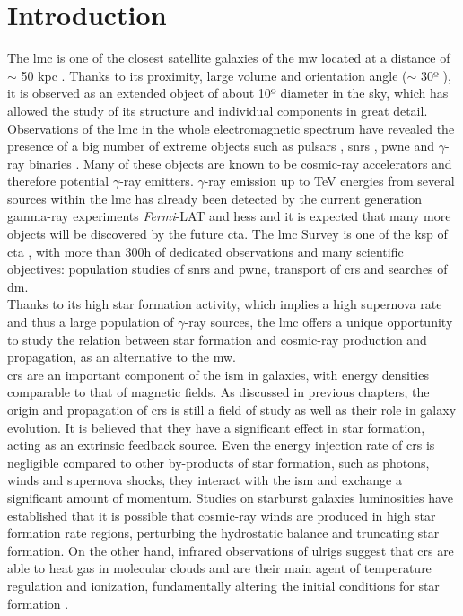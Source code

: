 \documentclass[main.tex]{subfiles}
\begin{document}
\glsresetall
\section{Introduction}

The \gls{lmc} is one of the closest satellite galaxies of the \gls{mw} located at a distance of $\sim$ 50 kpc \cite{2013LMCdistance1}. Thanks to its proximity, large volume and orientation angle ($\sim$ 30º \cite{2004StructureandOrientationLMC}), it is observed as an extended object of about 10º diameter in the sky, which has allowed the study of its structure and individual components in great detail. Observations of the \gls{lmc} in the whole electromagnetic spectrum have revealed the presence of a big number of extreme objects such as pulsars \cite{2013RadioPulsarsLMC} \cite{2016LMCFermiLAT}, \glspl{snr} \cite{2015MultiwavelengthLMCsnr} \cite{2012XMM1987} \cite{2016SNRinXrayLMC},  \gls{pwne} \cite{2015HESSTeVLMC} \cite{2016LMCFermiLAT} \cite{2003PWNeintheLMC} \cite{2008PWNeXrayLMC} and $\gamma$-ray binaries \cite{2017HESSLMCP3}. Many of these objects are known to be cosmic-ray accelerators and therefore potential $\gamma$-ray emitters. $\gamma$-ray emission up to TeV energies from several sources within the \gls{lmc} has already been detected by the current generation gamma-ray experiments \textit{Fermi}-LAT and \gls{hess} and it is expected that many more objects will be discovered by the future \gls{cta}. The \gls{lmc} Survey is one of the \gls{ksp} of \gls{cta} \cite{2019SciencewithCTA}, with more than 300h of dedicated observations and many scientific objectives: population studies of \glspl{snr} and \gls{pwne}, transport of \glspl{cr} and searches of \gls{dm}.\\
Thanks to its high star formation activity, which implies a high supernova rate and thus a large population of $\gamma$-ray sources, the \gls{lmc} offers a unique opportunity to study the relation between star formation and cosmic-ray production and propagation, as an alternative to the \gls{mw}.\\
\glspl{cr} are an important component of the \gls{ism} in galaxies, with energy densities comparable to that of magnetic fields. As discussed in previous chapters, the origin and propagation of \glspl{cr} is still a field of study as well as their role in galaxy evolution. It is believed that they have a significant effect in star formation, acting as an extrinsic feedback source. Even the energy injection rate of \glspl{cr} is negligible compared to other by-products of star formation, such as photons, winds and supernova shocks, they interact with the \gls{ism} and exchange a significant amount of momentum. Studies on starburst galaxies luminosities \cite{2008SocratesCRandSF} have established that it is possible that cosmic-ray winds are produced in high star formation rate regions, perturbing the hydrostatic balance and truncating star formation. On the other hand, infrared observations of \gls{ulrigs} suggest that \glspl{cr} are able to heat gas in molecular clouds and are their main agent of temperature regulation and ionization, fundamentally altering the initial conditions for star formation \cite{2010PapadopoulosCRinSF}.\\
\end{document}
